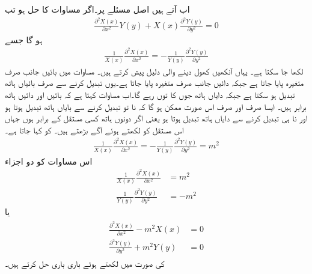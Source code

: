 اب آتے ہیں اصل مسئلے پر۔اگر  مساوات  کا حل ہو تب
\begin{align*}
\frac{\partial^2 X(x)}{\partial x^2} Y(y)+X(x)\frac{\partial^2 Y(y)}{\partial y^2}=0
\end{align*}
ہو گا جسے
\begin{align}\label{مساوات_لاپلاس_تفرقی_اجزاء_مستقل_کے_برابر}
\frac{1}{X(x)} \frac{\partial^2 X(x)}{\partial x^2}=-\frac{1}{Y(y)} \frac{\partial^2 Y(y)}{\partial y^2}
\end{align}
لکھا جا سکتا ہے۔ یہاں  آنکھیں کھول دینے والی دلیل پیش کرتے ہیں۔ مساوات   میں بائیں جانب صرف  متغیرہ پایا جاتا ہے جبکہ دائیں جانب صرف  متغیرہ پایا جاتا ہے۔یوں  تبدیل کرنے سے صرف بائیاں ہاتھ تبدیل ہو سکتا ہے جبکہ دایاں ہاتھ جوں کا توں رہے گا۔اب مساوات کہتا ہے کہ بائیں اور دائیں ہاتھ برابر ہیں۔ ایسا صرف اور صرف اس صورت ممکن ہو گا کہ نا تو  تبدیل کرنے سے بایاں ہاتھ تبدیل ہوتا ہو اور نا ہی  تبدیل کرنے سے دایاں ہاتھ تبدیل ہوتا ہو یعنی اگر دونوں ہاتھ کسی مستقل کے برابر ہوں جہاں اس مستقل کو  لکھتے ہوئے آگے بڑھتے ہیں۔ کو  کہا جاتا ہے۔
 \begin{align}\label{مساوات_لاپلاس_تفرقی_اجزاء_مستقل_کے_برابر_الف}
\frac{1}{X(x)} \frac{\partial^2 X(x)}{\partial x^2}=-\frac{1}{Y(y)} \frac{\partial^2 Y(y)}{\partial y^2}=m^2
\end{align}
اس مساوات کو دو اجزاء
\begin{align*}
\frac{1}{X(x)} \frac{\partial^2 X(x)}{\partial x^2}&=m^2\\
\frac{1}{Y(y)} \frac{\partial^2 Y(y)}{\partial y^2}&=-m^2
\end{align*}
یا
\begin{gather}
\begin{aligned}\label{مساوات_لاپلاس_تفرقی_اجزاء_مستقل_کے_برابر_ب}
\frac{\partial^2 X(x)}{\partial x^2}-m^2 X(x)&=0\\
\frac{\partial^2 Y(y)}{\partial y^2}+m^2 Y(y)&=0
\end{aligned}
\end{gather}
 کی صورت میں لکھتے ہوئے باری باری حل کرتے ہیں۔

